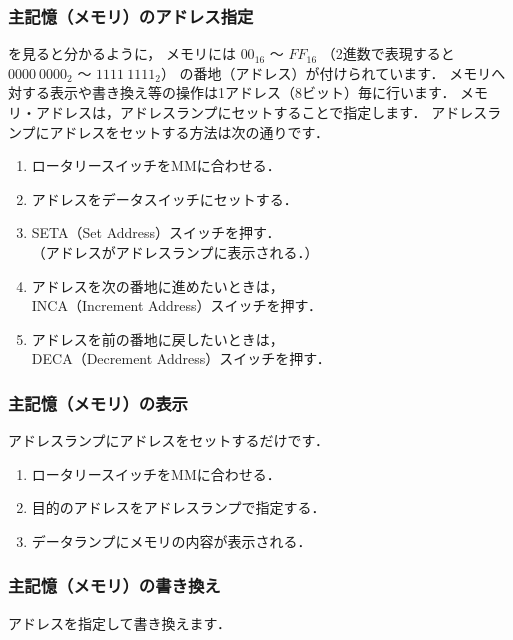 \subsubsection{主記憶（メモリ）のアドレス指定}
を見ると分かるように，
メモリには $00_{16}$ 〜 $FF_{16}$
（2進数で表現すると $0000~0000_{2}$ 〜 $1111~1111_{2}$）
の番地（アドレス）が付けられています．
メモリへ対する表示や書き換え等の操作は1アドレス（8ビット）毎に行います．
メモリ・アドレスは，アドレスランプにセットすることで指定します．
アドレスランプにアドレスをセットする方法は次の通りです．

\begin{enumerate}
\item ロータリースイッチをMMに合わせる．
\item アドレスをデータスイッチにセットする．
\item SETA（Set Address）スイッチを押す．\\
（アドレスがアドレスランプに表示される．）
\item アドレスを次の番地に進めたいときは，\\
INCA（Increment Address）スイッチを押す．
\item アドレスを前の番地に戻したいときは，\\
DECA（Decrement Address）スイッチを押す．
\end{enumerate}

\subsubsection{主記憶（メモリ）の表示}
アドレスランプにアドレスをセットするだけです．

\begin{enumerate}
\item ロータリースイッチをMMに合わせる．
\item 目的のアドレスをアドレスランプで指定する．
\item データランプにメモリの内容が表示される．
\end{enumerate}

\subsubsection{主記憶（メモリ）の書き換え}
アドレスを指定して書き換えます．

